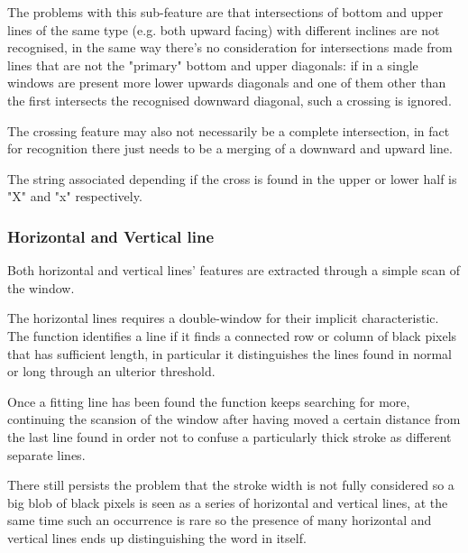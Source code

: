 The problems with this sub-feature are that intersections of bottom and upper lines of the same type (e.g. both upward facing) with different inclines are not recognised, in the same way there's no consideration for intersections made from lines that are not the "primary" bottom and upper diagonals: if in a single windows are present more lower upwards diagonals and one of them other than the first intersects the recognised downward diagonal, such a crossing is ignored.

The crossing feature may also not necessarily be a complete intersection, in fact for recognition there just needs to be a merging of a downward and upward line. 

The string associated depending if the cross is found in the upper or lower half is "X" and "x" respectively.


\subsubsection{Horizontal and Vertical line}
Both horizontal and vertical lines' features are extracted through
a simple scan of the window.

The horizontal lines requires a double-window for their implicit characteristic.
The function identifies a line if it finds a connected row or column of black pixels that has sufficient length, in particular it distinguishes the lines found in normal or long through an ulterior threshold.

Once a fitting line has been found the function keeps searching for more, continuing the scansion of the window after having moved a certain distance from the last line found in order not to confuse a particularly thick stroke as different separate lines.

There still persists the problem that the stroke width is not fully considered so a big blob of black pixels is seen as a series of horizontal and vertical lines, at the same time such an occurrence is rare so the presence of many horizontal and vertical lines ends up distinguishing the word in itself.    


